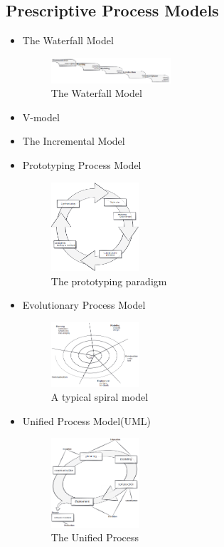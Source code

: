 \subsection{Prescriptive Process Models}

\begin{itemize}
    \item The Waterfall Model
    \begin{figure}[!htb]
        \centering
        \includegraphics[width=0.42\textwidth]{pic/SE2/The Waterfall Model}
        \caption{The Waterfall Model}
    \end{figure}
    \item V-model
    \item The Incremental Model
    \item Prototyping Process Model
    \begin{figure}[!htb]
        \centering
        \includegraphics[width=0.309\textwidth]{pic/SE2/The prototyping paradigm}
        \caption{The prototyping paradigm}
    \end{figure}
    
    \item Evolutionary Process Model
    \begin{figure}[!htb]
        \centering
        \includegraphics[width=0.309\textwidth]{pic/SE2/A typical spiral model}
        \caption{A typical spiral model}
    \end{figure}
    
    \item Unified Process Model(UML)
    \begin{figure}[!htb]
        \centering
        \includegraphics[width=0.309\textwidth]{pic/SE2/The Unified Process}
        \caption{The Unified Process}
    \end{figure}
    
\end{itemize}




